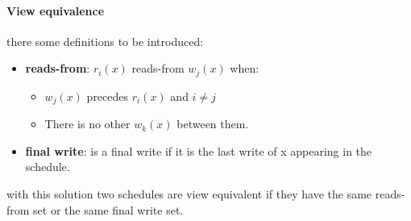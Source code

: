 \documentclass[12pt]{article}
\begin{document}
\paragraph{View equivalence} there some definitions to be introduced:
\begin{itemize}
  \item \textbf{reads-from}: $r_{i}(x)$ reads-from $w_{j}(x)$ when:
  \begin{itemize}
    \item $w_{j}(x)$ precedes $r_{i}(x)$ and $i \neq j$
    \item There is no other $w_{k}(x)$ between them.
  \end{itemize}
  \item \textbf{final write}: is a final write if it is the last write of x appearing in the schedule.
\end{itemize}
with this solution two schedules are view equivalent if they have the same reads-from set or the same final write set.



\end{document}
